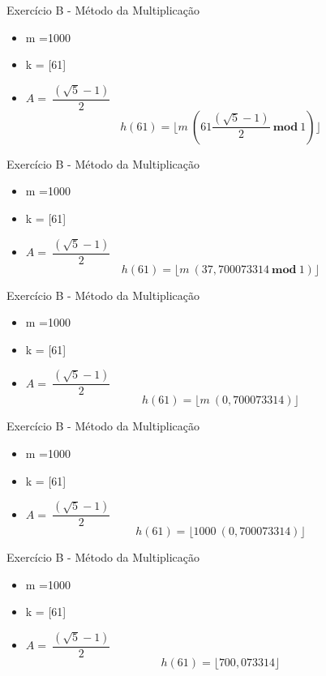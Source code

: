 \documentclass{beamer}
\begin{document}
\begin{frame}{Exercício B - Método da Multiplicação}
\begin{itemize}
 \item m =1000
 \item k = [61]
 \item $A = \ \dfrac{(\sqrt{5}-1)}{2}$ 
 $$h(61) = \lfloor m \ (61\dfrac{(\sqrt{5}-1)}{2} \ \mathbf{mod} \ 1)\rfloor$$  
\end{itemize}
\end{frame}

\begin{frame}{Exercício B - Método da Multiplicação}
\begin{itemize}
 \item m =1000
 \item k = [61]
 \item $A = \ \dfrac{(\sqrt{5}-1)}{2}$ 
 $$h(61) = \lfloor m \ (37,700073314 \ \mathbf{mod} \ 1)\rfloor$$  
\end{itemize}
\end{frame}

\begin{frame}{Exercício B - Método da Multiplicação}
\begin{itemize}
 \item m =1000
 \item k = [61]
 \item $A = \ \dfrac{(\sqrt{5}-1)}{2}$ 
 $$h(61) = \lfloor m \ (0,700073314)\rfloor$$  
\end{itemize}
\end{frame}

\begin{frame}{Exercício B - Método da Multiplicação}
\begin{itemize}
 \item m =1000
 \item k = [61]
 \item $A = \ \dfrac{(\sqrt{5}-1)}{2}$ 
 $$h(61) = \lfloor 1000 \ (0,700073314)\rfloor$$  
\end{itemize}
\end{frame}

\begin{frame}{Exercício B - Método da Multiplicação}
\begin{itemize}
 \item m =1000
 \item k = [61]
 \item $A = \ \dfrac{(\sqrt{5}-1)}{2}$ 
 $$h(61) = \lfloor 700,073314\rfloor$$  
\end{itemize}
\end{frame}
\end{document}
